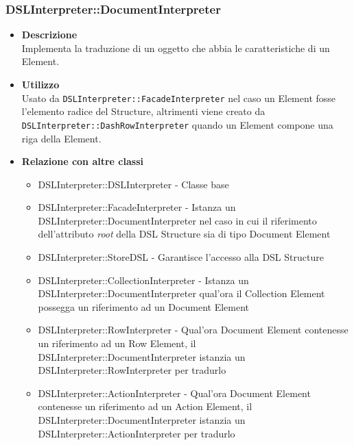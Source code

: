 \subsubsection{DSLInterpreter::DocumentInterpreter}
\begin{itemize}
\item \textbf{Descrizione} \hfill \\
  Implementa la traduzione di un oggetto che abbia le caratteristiche di un  Element.
\item \textbf{Utilizzo} \hfill \\
Usato da \texttt{DSLInterpreter::FacadeInterpreter} nel caso un  Element fosse l'elemento radice del  Structure, altrimenti viene creato da \\\texttt{DSLInterpreter::DashRowInterpreter} quando un  Element compone una riga della  Element.
\item \textbf{Relazione con altre classi}
  \begin{itemize}
  \item DSLInterpreter::DSLInterpreter - Classe base
  \item DSLInterpreter::FacadeInterpreter - Istanza un DSLInterpreter::DocumentInterpreter nel caso in cui il riferimento dell'attributo \textit{root} della DSL Structure sia di tipo Document Element
  \item DSLInterpreter::StoreDSL - Garantisce l'accesso alla DSL Structure
  \item DSLInterpreter::CollectionInterpreter - Istanza un DSLInterpreter::DocumentInterpreter qual'ora il Collection Element possegga un riferimento ad un Document Element
  \item DSLInterpreter::RowInterpreter - Qual'ora Document Element contenesse un riferimento ad un Row Element, il DSLInterpreter::DocumentInterpreter istanzia un DSLInterpreter::RowInterpreter per tradurlo
  \item DSLInterpreter::ActionInterpreter - Qual'ora Document Element contenesse un riferimento ad un Action Element, il DSLInterpreter::DocumentInterpreter istanzia un DSLInterpreter::ActionInterpreter per tradurlo
  \end{itemize}
\end{itemize}

